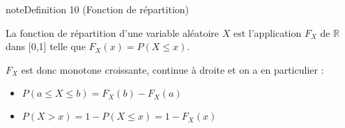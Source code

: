\documentclass[letterpaper,10pt,english]{jupyterBook}
\begin{document}
\ignorespaces \label{Rappels:definition-22}
\begin{sphinxadmonition}{note}{Definition 10 (Fonction de répartition)}



\sphinxAtStartPar
La fonction de répartition d’une variable aléatoire \(X\) est l’application \(F_X\) de \(\mathbb R\) dans {[}0,1{]} telle que \(F_X(x) = P(X\leq x)\).
\end{sphinxadmonition}

\sphinxAtStartPar
\(F_X\) est donc monotone croissante, continue à droite et on a en particulier :
\begin{itemize}
\item {} 
\sphinxAtStartPar
\(P(a\leq X\leq b) = F_X(b)-F_X(a)\)

\item {} 
\sphinxAtStartPar
\(P(X>x) = 1-P(X\leq x) = 1-F_X(x)\)

\end{itemize}
\end{document}
